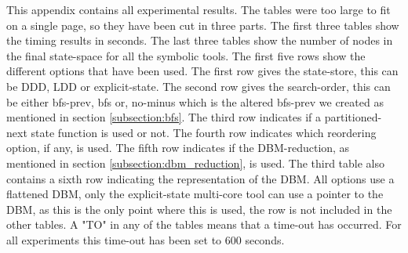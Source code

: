 This appendix contains all experimental results. The tables were too large to fit on a single page, so they have been cut in three parts. The first three tables show the timing results in seconds. The last three tables show the number of nodes in the final state-space for all the symbolic tools. The first five rows show the different options that have been used. The first row gives the state-store, this can be DDD, LDD or explicit-state. The second row gives the search-order, this can be either bfs-prev, bfs or, no-minus which is the altered bfs-prev we created as mentioned in section \ref{subsection:bfs}. The third row indicates if a partitioned-next state function is used or not. The fourth row indicates which reordering option, if any, is used. The fifth row indicates if the DBM-reduction, as mentioned in section \ref{subsection:dbm_reduction}, is used. The third table also contains a sixth row indicating the representation of the DBM. All options use a flattened DBM, only the explicit-state multi-core tool can use a pointer to the DBM, as this is the only point where this is used, the row is not included in the other tables. A "TO" in any of the tables means that a time-out has occurred. For all experiments this time-out has been set to 600 seconds.

